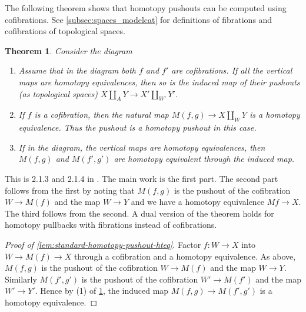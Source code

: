 \documentclass{scrartcl}
\theoremstyle{plain}
\newtheorem{theorem}{Theorem}[section]
\theoremstyle{definition}
\renewcommand{\coprod}{\mathbin{\amalg}}
\begin{document}
The following theorem shows that homotopy pushouts can be computed using cofibrations. See \ref{subsec:spaces_modelcat} for definitions of fibrations and cofibrations of topological spaces.
\begin{theorem}\label{thm:homotopy-pushout-properties}
    Consider the diagram

    \begin{center}
    \end{center}

    \begin{enumerate}
    \item Assume that in the diagram 
    both $f$ and $f'$ are cofibrations. If all the vertical maps are homotopy equivalences, then so is the induced map of their pushouts (as topological spaces) $X\coprod_A Y \to X'\coprod_{W'} Y'$.
    \item If $f$ is a cofibration, then the natural map $M(f,g)\to X\coprod_W Y$ is a homotopy equivalence. Thus the pushout is a homotopy pushout in this case. 
    \item If in the diagram, the vertical maps are homotopy equivalences, then $M(f, g)$ and $M(f', g')$ are homotopy equivalent through the induced map.
    \end{enumerate}
\end{theorem}
This is 2.1.3 and 2.1.4 in \cite{may2011more}. The main work is the first part. The second part follows from the first by noting that $M(f, g)$ is the pushout of the cofibration $W\to M(f)$ and the map $W\to Y$ and we have a homotopy equivalence $Mf \to X$. The third follows from the second. A dual version of the theorem holds for homotopy pullbacks with fibrations instead of cofibrations.


\begin{proof}[Proof of \cref{lem:standard-homotopy-pushout-hteq}]
    Factor $f\colon W\to X$ into $W\to M(f)\to X$ through a cofibration and a homotopy equivalence. As above, $M(f, g)$ is the pushout of the cofibration $W\to M(f)$ and the map $W\to Y$. Similarly $M(f', g')$ is the pushout of the cofibration $W'\to M(f')$ and the map $W'\to Y'$. Hence by (1) of \cref{thm:homotopy-pushout-properties}, the induced map $M(f, g)\to M(f', g')$ is a homotopy equivalence. 
\end{proof}
\end{document}
